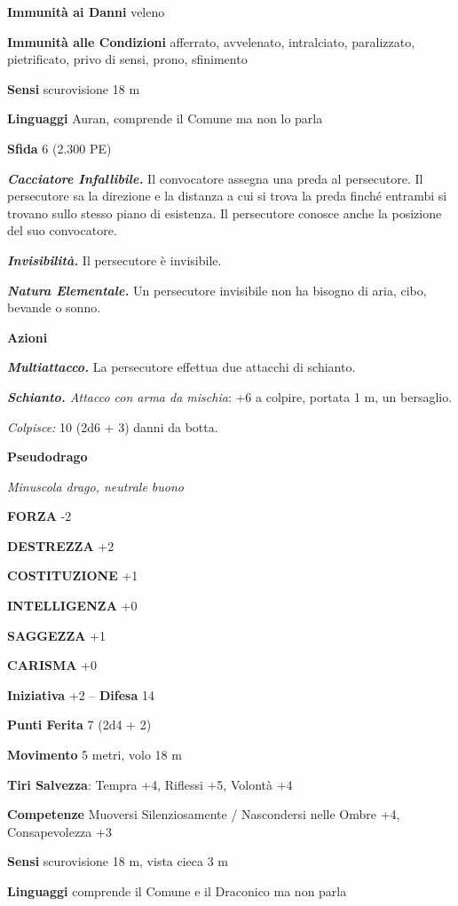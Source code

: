\begin{multicols}{2}
\textbf{Immunità ai Danni} veleno

\textbf{Immunità alle Condizioni} afferrato, avvelenato, intralciato, paralizzato, pietrificato, privo di sensi, prono, sfinimento

\textbf{Sensi} scurovisione 18 m

\textbf{Linguaggi} Auran, comprende il Comune ma non lo parla

\textbf{Sfida} 6 (2.300 PE)

\emph{\textbf{Cacciatore Infallibile.}} Il convocatore assegna una preda
al persecutore. Il persecutore sa la direzione e la distanza a cui si
trova la preda finché entrambi si trovano sullo stesso piano di
esistenza. Il persecutore conosce anche la posizione del suo
convocatore.

\emph{\textbf{Invisibilità.}} Il persecutore è invisibile.

\emph{\textbf{Natura Elementale.}} Un persecutore invisibile non ha bisogno di aria, cibo, bevande o sonno.

\textbf{Azioni}

\emph{\textbf{Multiattacco.}} La persecutore effettua due attacchi di schianto.

\emph{\textbf{Schianto.} Attacco con arma da mischia}: +6 a colpire, portata 1 m, un bersaglio.

\emph{Colpisce:} 10 (2d6 + 3) danni da botta.

\medskip{}\textbf{Pseudodrago}

\emph{Minuscola drago, neutrale buono}

\textbf{FORZA} -2

\textbf{DESTREZZA} +2

\textbf{COSTITUZIONE} +1

\textbf{INTELLIGENZA} +0

\textbf{SAGGEZZA} +1

\textbf{CARISMA} +0

\textbf{Iniziativa} +2 -- \textbf{Difesa} 14

\textbf{Punti Ferita} 7 (2d4 + 2)

\textbf{Movimento} 5 metri, volo 18 m

\textbf{Tiri Salvezza}: Tempra +4, Riflessi +5, Volontà +4

\textbf{Competenze} Muoversi Silenziosamente / Nascondersi nelle Ombre +4, Consapevolezza +3

\textbf{Sensi} scurovisione 18 m, vista cieca 3 m

\textbf{Linguaggi} comprende il Comune e il Draconico ma non parla


\end{multicols}
